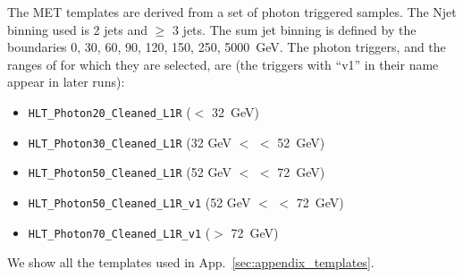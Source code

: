 The MET templates are derived from a set of photon triggered samples. 
The Njet binning used is 2 jets and $\ge$ 3 jets. 
The sum jet \pt binning is defined by the boundaries {0, 30, 60, 90, 120, 150, 250, 5000}~GeV.
The photon triggers, and the ranges of \Z \pt for which they are selected, are (the triggers with ``v1'' in their name appear in later runs):

\begin{itemize}
\item \verb=HLT_Photon20_Cleaned_L1R= (\Z \pt $<$ 32~GeV)
\item \verb=HLT_Photon30_Cleaned_L1R= (32 GeV $<$ \Z \pt $<$ 52~GeV)
\item \verb=HLT_Photon50_Cleaned_L1R= (52 GeV $<$ \Z \pt $<$ 72~GeV)
\item \verb=HLT_Photon50_Cleaned_L1R_v1= (52 GeV $<$ \Z \pt $<$ 72~GeV)
\item \verb=HLT_Photon70_Cleaned_L1R_v1= (\Z \pt $>$ 72~GeV)
\end{itemize}

We show all the templates used in App.~\ref{sec:appendix_templates}.


